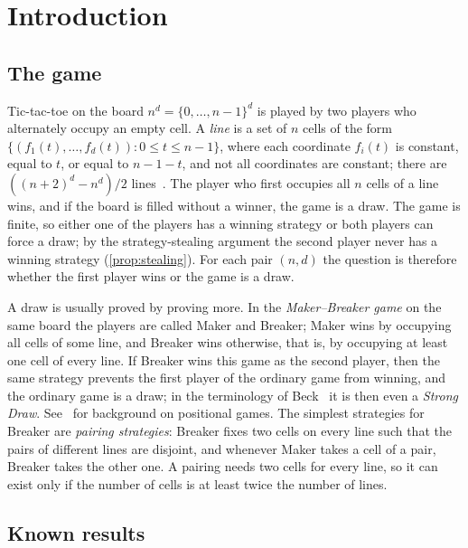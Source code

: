 \section{Introduction}\label{sec:intro}

\subsection{The game}\label{ssec:intro-game}

Tic-tac-toe on the board $n^d=\{0,\dots,n-1\}^d$ is played by two players who alternately occupy an
empty cell. A \emph{line} is a set of $n$ cells of the form $\{(f_1(t),\dots,f_d(t)) : 0\le t\le n-1\}$,
where each coordinate $f_i(t)$ is constant, equal to $t$, or equal to $n-1-t$, and not all coordinates
are constant; there are $((n+2)^d-n^d)/2$ lines~\cite[Theorem~1]{GolombHales2002}. The player who first
occupies all $n$ cells of a line wins, and if the board is filled without a winner, the game is a draw.
The game is finite, so either one of the players has a winning strategy or both players can force a
draw; by the strategy-stealing argument the second player never has a winning strategy
(\cref{prop:stealing}). For each pair $(n,d)$ the question is therefore whether the first player wins
or the game is a draw.

A draw is usually proved by proving more. In the \emph{Maker--Breaker game} on the same board the
players are called Maker and Breaker; Maker wins by occupying all cells of some line, and Breaker wins
otherwise, that is, by occupying at least one cell of every line. If Breaker wins this game as the
second player, then the same strategy prevents the first player of the ordinary game from winning, and
the ordinary game is a draw; in the terminology of Beck~\cite{Beck2008} it is then even a \emph{Strong
Draw}. See~\cite{Beck2008,HefetzKrivelevichStojakovicSzabo2014,Krivelevich2014} for background on
positional games. The simplest strategies for Breaker are \emph{pairing strategies}: Breaker fixes two
cells on every line such that the pairs of different lines are disjoint, and whenever Maker takes a
cell of a pair, Breaker takes the other one. A pairing needs two cells for every line, so it can exist
only if the number of cells is at least twice the number of lines.

\subsection{Known results}\label{ssec:intro-known}

